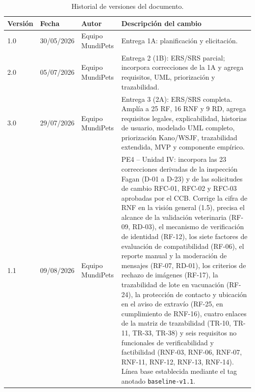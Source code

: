 \documentclass[journal,onecolumn]{IEEEtran}
\begin{document}
	\begin{table}[H]
		\centering
		\caption{Historial de versiones del documento.}
		\label{tab:historial}
		\small
		\begin{tabularx}{\textwidth}{@{}l l l X@{}}
			\toprule
			\textbf{Versión} & \textbf{Fecha} & \textbf{Autor} & \textbf{Descripción del cambio} \\
			\midrule
			1.0 & 30/05/2026 & Equipo MundiPets & Entrega 1A: planificación y elicitación. \\
			2.0 & 05/07/2026 & Equipo MundiPets & Entrega 2 (1B): ERS/SRS parcial; incorpora correcciones de la 1A y agrega requisitos, UML, priorización y trazabilidad. \\
			3.0 & 29/07/2026 & Equipo MundiPets & Entrega 3 (2A): ERS/SRS completa. Amplía a 25 RF, 16 RNF y 9 RD, agrega requisitos legales, explicabilidad, historias de usuario, modelado UML completo, priorización Kano/WSJF, trazabilidad extendida, MVP y componente empírico. \\
			1.1 & 09/08/2026 & Equipo MundiPets & PE4 -- Unidad IV: incorpora las 23 correcciones derivadas de la inspección Fagan (D-01 a D-23) y de las solicitudes de cambio RFC-01, RFC-02 y RFC-03 aprobadas por el CCB. Corrige la cifra de RNF en la visión general (1.5), precisa el alcance de la validación veterinaria (RF-09, RD-03), el mecanismo de verificación de identidad (RF-12), los siete factores de evaluación de compatibilidad (RF-06), el reporte manual y la moderación de mensajes (RF-07, RD-01), los criterios de rechazo de imágenes (RF-17), la trazabilidad de lote en vacunación (RF-24), la protección de contacto y ubicación en el aviso de extravío (RF-25, en cumplimiento de RNF-16), cuatro enlaces de la matriz de trazabilidad (TR-10, TR-11, TR-33, TR-38) y seis requisitos no funcionales de verificabilidad y factibilidad (RNF-03, RNF-06, RNF-07, RNF-11, RNF-12, RNF-13, RNF-14). Línea base establecida mediante el tag anotado \texttt{baseline-v1.1}. \\
			\bottomrule
		\end{tabularx}
	\end{table}
	
	\newpage
	\tableofcontents
	\newpage
	\listoffigures
	\listoftables
	\lstlistoflistings
	\newpage
	
\end{document}
